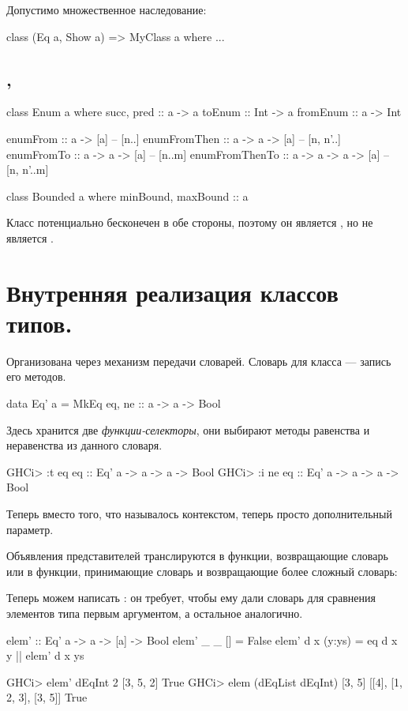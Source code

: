 \documentclass[11pt,a4paper]{article}
\begin{document}
Допустимо множественное наследование:
\begin{hscode}
class (Eq a, Show a) => MyClass a where
  ...
\end{hscode}

\subsection{, }
\begin{hscode}
class Enum a where 
  succ, pred     :: a -> a
  toEnum         :: Int -> a
  fromEnum       :: a -> Int

  enumFrom       :: a -> [a]            -- [n..]
  enumFromThen   :: a -> a -> [a]       -- [n, n'..]
  enumFromTo     :: a -> a -> [a]       -- [n..m]
  enumFromThenTo :: a -> a -> a -> [a]  -- [n, n'..m]

class Bounded a where
  minBound, maxBound :: a
\end{hscode}
Класс  потенциально бесконечен в обе стороны, поэтому он является , но не является .


\section{Внутренняя реализация классов типов.}
Организована через механизм передачи словарей. Словарь для класса --- запись его методов.
\begin{hscode}
data Eq' a = MkEq { eq, ne :: a -> a -> Bool}
\end{hscode}
Здесь хранится две \textit{функции-селекторы}, они выбирают методы равенства и неравенства из данного словаря.
\begin{hscode}
GHCi> :t eq
eq :: Eq' a -> a -> a -> Bool
GHCi> :i ne
eq :: Eq' a -> a -> a -> Bool
\end{hscode}
Теперь вместо того, что называлось контекстом, теперь просто дополнительный параметр.

Объявления представителей транслируются в функции, возвращающие словарь или в функции, принимающие словарь и возвращающие более сложный словарь:
Теперь можем написать : он требует, чтобы ему дали словарь для сравнения элементов типа  первым аргументом, а остальное аналогично.
\begin{hscode}
elem' :: Eq' a -> a -> [a] -> Bool
elem' _ _ [] = False
elem' d x (y:ys) = eq d x y || elem' d x ys

GHCi> elem' dEqInt 2 [3, 5, 2]
True
GHCi> elem (dEqList dEqInt) [3, 5] [[4], [1, 2, 3], [3, 5]]
True
\end{hscode}
\end{document}
